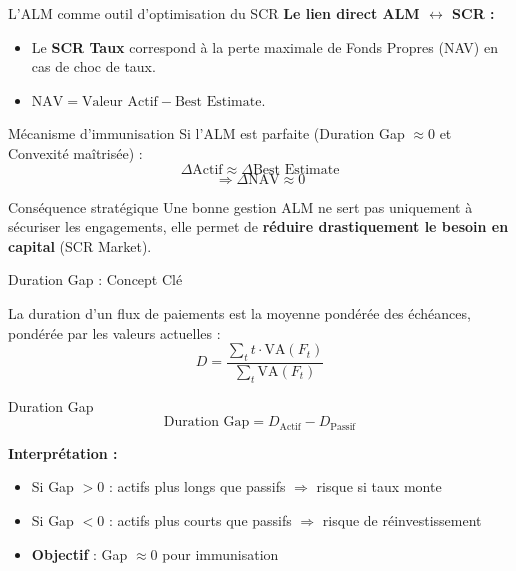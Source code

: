 \documentclass[10pt,aspectratio=169,xcolor={dvipsnames}]{beamer}
\begin{document}
\begin{frame}{L'ALM comme outil d'optimisation du SCR}
\textbf{Le lien direct ALM $\leftrightarrow$ SCR :}
\begin{itemize}
    \item Le \textbf{SCR Taux} correspond à la perte maximale de Fonds Propres (NAV) en cas de choc de taux.
    \item $\text{NAV} = \text{Valeur Actif} - \text{Best Estimate}$.
\end{itemize}

\vspace{0.3cm}
\begin{block}{Mécanisme d'immunisation}
Si l'ALM est parfaite (Duration Gap $\approx 0$ et Convexité maîtrisée) :
\[ \Delta \text{Actif} \approx \Delta \text{Best Estimate} \]
\[ \Rightarrow \Delta \text{NAV} \approx 0 \]
\end{block}

\vspace{0.3cm}
\begin{alertblock}{Conséquence stratégique}
Une bonne gestion ALM ne sert pas uniquement à sécuriser les engagements, elle permet de \textbf{réduire drastiquement le besoin en capital} (SCR Market).
\end{alertblock}
\end{frame}

\begin{frame}{Duration Gap : Concept Clé}
\begin{definition}[Duration]
La duration d'un flux de paiements est la moyenne pondérée des échéances, pondérée par les valeurs actuelles :
\[
D = \frac{\sum_{t} t \cdot \text{VA}(F_t)}{\sum_{t} \text{VA}(F_t)}
\]
\end{definition}

\vspace{0.3cm}
\begin{block}{Duration Gap}
\[
\text{Duration Gap} = D_{\text{Actif}} - D_{\text{Passif}}
\]

\textbf{Interprétation :}
\begin{itemize}
    \item Si Gap $> 0$ : actifs plus longs que passifs $\Rightarrow$ risque si taux monte
    \item Si Gap $< 0$ : actifs plus courts que passifs $\Rightarrow$ risque de réinvestissement
    \item \textbf{Objectif} : Gap $\approx 0$ pour immunisation
\end{itemize}
\end{block}
\end{frame}
\end{document}
